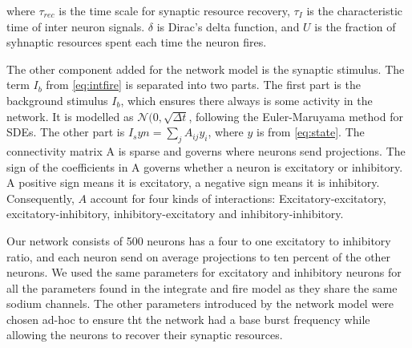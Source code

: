 where \(\tau_{rec}\) is the time scale for synaptic resource recovery, \(\tau_I\) is the
characteristic time of inter neuron signals. \(\delta\) is Dirac's delta function, and \(U\) is the
fraction of syhnaptic resources spent each time the neuron fires.

The other component added for the network model is the synaptic stimulus. The term \(I_b\) from
\ref{eq:intfire} is separated into two parts. The first part is the background stimulus \(I_b\),
which ensures there always is some activity in the network. It is modelled as
\(\mathcal{N}(0, \sqrt{\Delta t}\), following the Euler-Maruyama method for SDEs. The other part is
\(I_syn = \sum_{j}A_{ij}y_i\), where \(y\) is from \cref{eq:state}. The connectivity matrix A is
sparse and governs where neurons send projections. The sign of the coefficients in A governs whether
a neuron is excitatory or inhibitory. A positive sign means it is excitatory, a negative sign means
it is inhibitory. Consequently, \(A\) account for four kinds of interactions: Excitatory-excitatory,
excitatory-inhibitory, inhibitory-excitatory and inhibitory-inhibitory.

Our network consists of 500 neurons has a four to one excitatory to inhibitory ratio, and each
neuron send on average projections to ten percent of the other neurons. We used the same parameters
for excitatory and inhibitory neurons for all the parameters found in the integrate and fire model
as they share the same sodium channels. The other parameters introduced by the network model were
chosen ad-hoc to ensure tht the network had a base burst frequency while allowing the neurons to
recover their synaptic resources.



